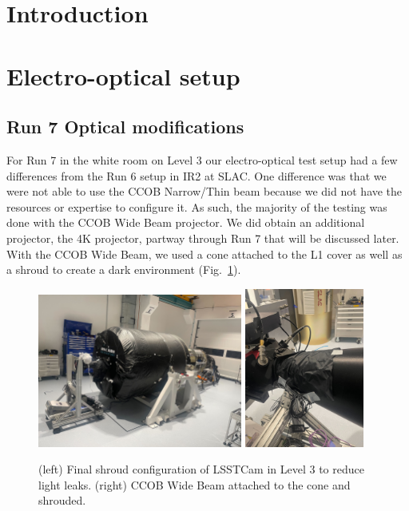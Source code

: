 \section{Introduction}

\section{Electro-optical setup}\label{electro-optical-setup}

\subsection{Run 7 Optical modifications}\label{run-7-optical-modifications}

For Run 7 in the white room on Level 3 our electro-optical test setup had a few differences from the Run 6 setup in IR2 at SLAC. One difference was that we were not able to use the CCOB Narrow/Thin beam because we did not have the resources or expertise to configure it. As
such, the majority of the testing was done with the CCOB Wide Beam
projector. We did obtain an additional projector, the 4K projector, partway through Run 7 that will be discussed later. With the CCOB Wide Beam,
we used a cone attached to the L1 cover as well as a shroud to create a
dark environment (Fig.~\ref{fig:LSSTCam_config}).

\begin{figure}[htbp]
\centering
    \includegraphics[width=0.6\textwidth]{figures/Camera_Shroud.jpg} 
    \includegraphics[width=0.35\textwidth]{figures/CCOB_Wide_Shroud.jpg} \\
\caption{(left) Final shroud configuration of LSSTCam in Level 3 to reduce light leaks. (right) CCOB Wide Beam attached to the cone and shrouded.}
\label{fig:LSSTCam_config}
\end{figure}

